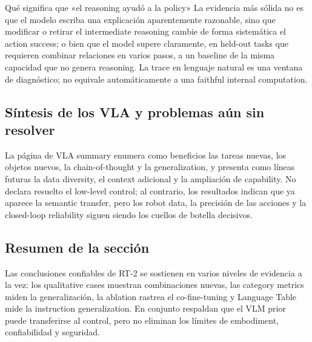 

\begin{knowledgebox}{Qué significa que «el reasoning ayudó a la policy»}
La evidencia más sólida no es que el modelo escriba una explicación aparentemente razonable, sino que modificar o retirar el intermediate reasoning cambie de forma sistemática el action success; o bien que el model supere claramente, en held-out tasks que requieren combinar relaciones en varios pasos, a un baseline de la misma capacidad que no genera reasoning. La trace en lenguaje natural es una ventana de diagnóstico; no equivale automáticamente a una faithful internal computation.
\end{knowledgebox}

\subsection{Síntesis de los VLA y problemas aún sin resolver}

La página de VLA summary enumera como beneficios las tareas nuevas, los objetos nuevos, la chain-of-thought y la generalization, y presenta como líneas futuras la data diversity, el context adicional y la ampliación de capability. No declara resuelto el low-level control; al contrario, los resultados indican que ya aparece la semantic transfer, pero los robot data, la precisión de las acciones y la closed-loop reliability siguen siendo los cuellos de botella decisivos.



\subsection{Resumen de la sección}

Las conclusiones confiables de RT-2 se sostienen en varios niveles de evidencia a la vez: los qualitative cases muestran combinaciones nuevas, las category metrics miden la generalización, la ablation rastrea el co-fine-tuning y Language Table mide la instruction generalization. En conjunto respaldan que el VLM prior puede transferirse al control, pero no eliminan los límites de embodiment, confiabilidad y seguridad.
